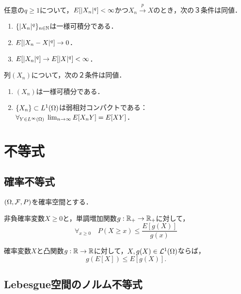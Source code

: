 \documentclass[uplatex,dvipdfmx]{jsreport}
\begin{document}
\begin{corollary}[さらに一般化]
    任意の$q\ge1$について，$E[\lvert X_n\rvert^q]<\infty$かつ$X_n\xrightarrow{p}X$のとき，次の３条件は同値．
    \begin{enumerate}
        \item $\{\lvert X_n\rvert^q\}_{n\in\mathbb{N}}$は一様可積分である．
        \item $E[\lvert X_n-X\rvert^q]\to0$．
        \item $E[\lvert X_n\rvert^q]\to E[\lvert X\rvert^q]<\infty$．
    \end{enumerate}
\end{corollary}

\begin{theorem}
    列$(X_n)$について，次の２条件は同値．
    \begin{enumerate}
        \item $(X_n)$は一様可積分である．
        \item $\{X_n\}\subset L^1(\Omega)$は弱相対コンパクトである：$\forall_{Y\in L^\infty(\Omega)}\;\lim_{n\to\infty}E[X_nY]=E[XY]$．
    \end{enumerate}
\end{theorem}

\section{不等式}

\subsection{確率不等式}

\begin{notation}
    $(\Omega,\mathcal{F},P)$を確率空間とする．
\end{notation}

\begin{proposition}[Markovの不等式]
    非負確率変数$X\ge0$と，単調増加関数$g:\mathbb{R}_+\to\mathbb{R}_+$に対して，
    \[\forall_{x\ge 0}\quad P(X\ge x)\le\frac{E[g(X)]}{g(x)}\]
\end{proposition}

\begin{proposition}[Jensenの不等式]
    確率変数$X$と凸関数$g:\mathbb{R}\to\mathbb{R}$に対して，$X,g(X)\in\mathcal{L}^1(\Omega)$ならば，
    \[g(E[X])\le E[g(X)].\]
\end{proposition}

\subsection{Lebesgue空間のノルム不等式}
\end{document}
